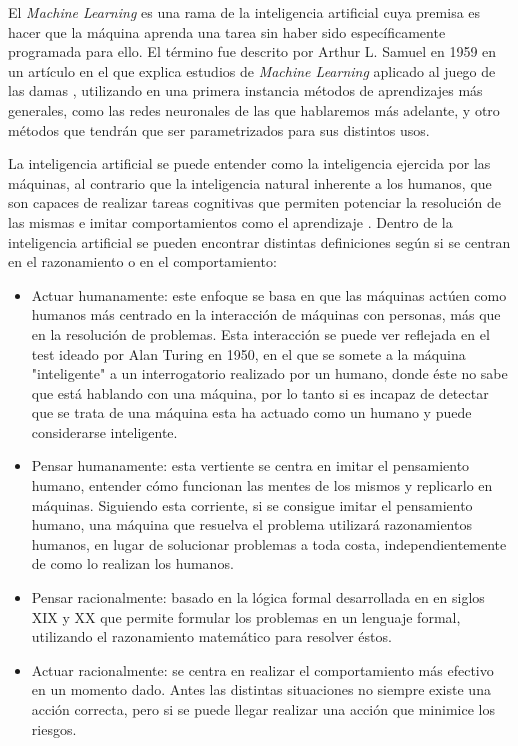 El \textit{Machine Learning} es una rama de la inteligencia artificial cuya premisa es hacer que la máquina aprenda una tarea sin haber sido específicamente programada para ello. El término fue descrito por Arthur L. Samuel en 1959 en un artículo en el que explica estudios de \textit{Machine Learning} aplicado al juego de las damas \cite{samuel2000some}, utilizando en una primera instancia métodos de aprendizajes más generales, como las redes neuronales de las que hablaremos más adelante, y otro métodos que tendrán que ser parametrizados para sus distintos usos.

La inteligencia artificial se puede entender como la inteligencia ejercida por las máquinas, al contrario que la inteligencia natural inherente a los humanos, que son capaces de realizar tareas cognitivas que permiten potenciar la resolución de las mismas e imitar comportamientos como el aprendizaje \cite{russell2016artificial}. Dentro de la inteligencia artificial se pueden encontrar distintas definiciones según si se centran en el razonamiento o en el comportamiento:

\begin{itemize}
    \item Actuar humanamente: este enfoque se basa en que las máquinas actúen como humanos más centrado en la interacción de máquinas con personas, más que en la resolución de problemas. Esta interacción se puede ver reflejada en el test ideado por Alan Turing en 1950, en el que se somete a la máquina "inteligente" a un interrogatorio realizado por un humano, donde éste no sabe que está hablando con una máquina, por lo tanto si es incapaz de detectar que se trata de una máquina esta ha actuado como un humano y puede considerarse inteligente.
    \item Pensar humanamente: esta vertiente se centra en imitar el pensamiento humano, entender cómo funcionan las mentes de los mismos y replicarlo en máquinas. Siguiendo esta corriente, si se consigue imitar el pensamiento humano, una máquina que resuelva el problema utilizará razonamientos humanos, en lugar de solucionar problemas a toda costa, independientemente de como lo realizan los humanos.
    \item Pensar racionalmente: basado en la lógica formal desarrollada en en siglos XIX y XX que permite formular los problemas en un lenguaje formal, utilizando el razonamiento matemático para resolver éstos.
    \item Actuar racionalmente: se centra en realizar el comportamiento más efectivo en un momento dado. Antes las distintas situaciones no siempre existe una acción correcta, pero si se puede llegar realizar una acción que minimice los riesgos.
\end{itemize}

